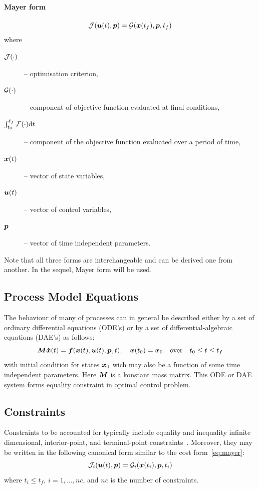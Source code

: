 \paragraph{Mayer form}
\begin{equation}
\mf{J}(\ve{u}(t),\ve{p}) = \mf{G}(\ve{x}(t_{f}),\ve{p},t_{f})
\label{eq:mayer} 
\end{equation}where
\begin{description}
\item[$\mathcal{J}(\cdot)$] -- optimisation criterion,
\item[$\mathcal{G}(\cdot)$] -- component of objective function evaluated at
  final conditions, 
\item[$\int_{t_{0}}^{t_{f}}\mathcal{F}(\cdot)\textnormal{\text{d}}{}t$] -- component of the
  objective 
  function evaluated over a period of time, 
\item[$\ve{x}(t)$] --  vector of state variables,
\item[$\ve{u}(t)$] -- vector of control variables,
\item[$\ve{p}$] -- vector of time independent parameters.
\end{description}
Note that all three forms are interchangeable and can be derived one
from another. In the sequel, Mayer form will be used.
 
\subsection{Process Model Equations}
\label{sec:pme}

The behaviour of many of processes can in general be described either
by a set of ordinary differential equations (ODE's) or by a set of
differential-algebraic equations (DAE's) as follows:
\begin{equation}
\ve{M\dot{x}}(t) = \ve{f}(\ve{x}(t),\ve{u}(t),\ve{p},t), \quad
\ve{x}(t_{0}) = \ve{x}_{0} \quad \textnormal{over} \quad t_{0} \leq t
\leq t_{f} \label{eq:process} 
\end{equation} with initial condition for states $\ve{x}_{0}$ wich may
also be a function of some time independent parameters. Here $\ve{M}$
is a konstant mass matrix. This ODE or DAE system forms equality constraint
in optimal control problem. 

\subsection{Constraints}
\label{sec:cons}

Constraints to be accounted for typically include
equality and inequality infinite dimensional, interior-point, and
terminal-point constraints~\cite{goh88}. Moreover, they may be written
in the following canonical form similar to the cost
form~\eqref{eq:mayer}: 
\begin{equation}
\mf{J}_{i}(\ve{u}(t),\ve{p}) = \mf{G}_{i}(\ve{x}(t_{i}),\ve{p},t_{i}) 
\label{eq:constraints} 
\end{equation} where $t_{i} \leq t_{f},~i=1,\ldots,nc$, and $nc$ is
the number of constraints.

